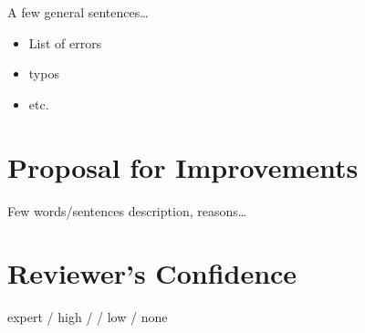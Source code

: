 \documentclass[a4paper,12pt]{article}
\begin{document}
A few general sentences\dots

\begin{itemize}
\item List of errors
\item typos
\item etc.
\end{itemize}


\section{Proposal for Improvements}

Few words/sentences description, reasons\dots  %


\section{Reviewer's Confidence}

expert / high /  / low / none




\end{document}
